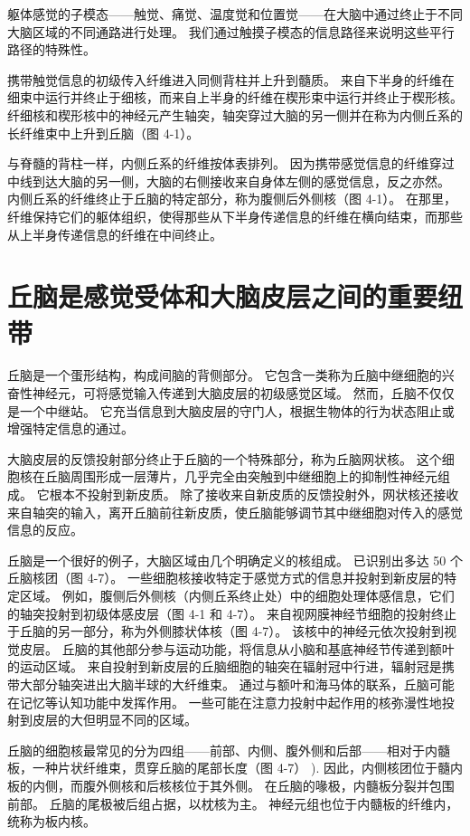 躯体感觉的子模态——触觉、痛觉、温度觉和位置觉——在大脑中通过终止于不同大脑区域的不同通路进行处理。 我们通过触摸子模态的信息路径来说明这些平行路径的特殊性。

携带触觉信息的初级传入纤维进入同侧背柱并上升到髓质。 来自下半身的纤维在细束中运行并终止于细核，而来自上半身的纤维在楔形束中运行并终止于楔形核。 纤细核和楔形核中的神经元产生轴突，轴突穿过大脑的另一侧并在称为内侧丘系的长纤维束中上升到丘脑（图 4-1）。

与脊髓的背柱一样，内侧丘系的纤维按体表排列。 因为携带感觉信息的纤维穿过中线到达大脑的另一侧，大脑的右侧接收来自身体左侧的感觉信息，反之亦然。 内侧丘系的纤维终止于丘脑的特定部分，称为腹侧后外侧核（图 4-1）。 在那里，纤维保持它们的躯体组织，使得那些从下半身传递信息的纤维在横向结束，而那些从上半身传递信息的纤维在中间终止。

\section{丘脑是感觉受体和大脑皮层之间的重要纽带}

丘脑是一个蛋形结构，构成间脑的背侧部分。 它包含一类称为丘脑中继细胞的兴奋性神经元，可将感觉输入传递到大脑皮层的初级感觉区域。 然而，丘脑不仅仅是一个中继站。 它充当信息到大脑皮层的守门人，根据生物体的行为状态阻止或增强特定信息的通过。

大脑皮层的反馈投射部分终止于丘脑的一个特殊部分，称为丘脑网状核。 这个细胞核在丘脑周围形成一层薄片，几乎完全由突触到中继细胞上的抑制性神经元组成。 它根本不投射到新皮质。 除了接收来自新皮质的反馈投射外，网状核还接收来自轴突的输入，离开丘脑前往新皮质，使丘脑能够调节其中继细胞对传入的感觉信息的反应。

丘脑是一个很好的例子，大脑区域由几个明确定义的核组成。 已识别出多达 50 个丘脑核团（图 4-7）。 一些细胞核接收特定于感觉方式的信息并投射到新皮层的特定区域。 例如，腹侧后外侧核（内侧丘系终止处）中的细胞处理体感信息，它们的轴突投射到初级体感皮层（图 4-1 和 4-7）。 来自视网膜神经节细胞的投射终止于丘脑的另一部分，称为外侧膝状体核（图 4-7）。 该核中的神经元依次投射到视觉皮层。 丘脑的其他部分参与运动功能，将信息从小脑和基底神经节传递到额叶的运动区域。 来自投射到新皮层的丘脑细胞的轴突在辐射冠中行进，辐射冠是携带大部分轴突进出大脑半球的大纤维束。 通过与额叶和海马体的联系，丘脑可能在记忆等认知功能中发挥作用。 一些可能在注意力投射中起作用的核弥漫性地投射到皮层的大但明显不同的区域。

丘脑的细胞核最常见的分为四组——前部、内侧、腹外侧和后部——相对于内髓板，一种片状纤维束，贯穿丘脑的尾部长度（图 4-7） ). 因此，内侧核团位于髓内板的内侧，而腹外侧核和后核核位于其外侧。 在丘脑的喙极，内髓板分裂并包围前部。 丘脑的尾极被后组占据，以枕核为主。 神经元组也位于内髓板的纤维内，统称为板内核。

